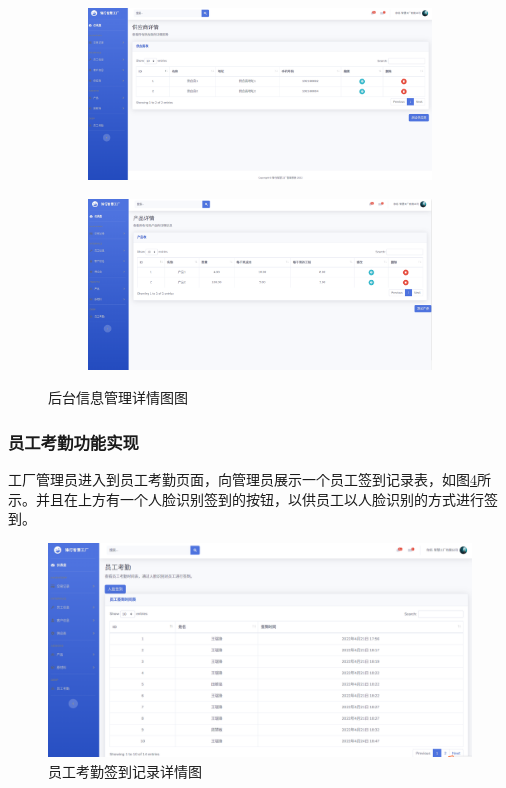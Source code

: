 \begin{figure}[H]
\begin{subfigure}{.45\textwidth}
        \centering
        \includegraphics[width=\textwidth]{figures/5supplierdetail.png}
        \label{fig:spledtl}
    \end{subfigure}
    \qquad
    \begin{subfigure}{.45\textwidth}
        \centering
        \includegraphics[width=\textwidth]{figures/5productdetail.png}
        \label{fig:prdctdtl}
    \end{subfigure}
    \caption{后台信息管理详情图图}
\end{figure}

\subsubsection{员工考勤功能实现}

工厂管理员进入到员工考勤页面，向管理员展示一个员工签到记录表，如图\ref{fig:empleatd}所示。并且在上方有一个人脸识别签到的按钮，以供员工以人脸识别的方式进行签到。

\begin{figure}[H]
    \centering
    \includegraphics[width=.75\textwidth]{figures/5empleatd.png}
    \caption{员工考勤签到记录详情图}
    \label{fig:empleatd}
\end{figure}

